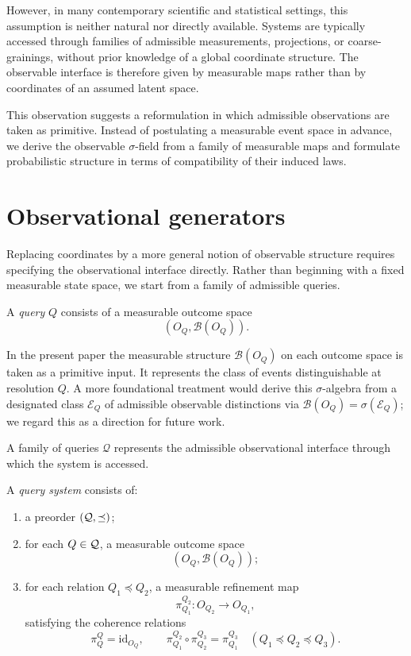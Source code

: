 However, in many contemporary scientific and statistical settings, this assumption is neither natural nor directly available. Systems are typically accessed through families of admissible measurements, projections, or coarse-grainings, without prior knowledge of a global coordinate structure. The observable interface is therefore given by measurable maps rather than by coordinates of an assumed latent space.

This observation suggests a reformulation in which admissible observations are taken as primitive. Instead of postulating a measurable event space in advance, we derive the observable $\sigma$-field from a family of measurable maps and formulate probabilistic structure in terms of compatibility of their induced laws.

\section{Observational generators}

Replacing coordinates by a more general notion of observable structure
requires specifying the observational interface directly.
Rather than beginning with a fixed measurable state space,
we start from a family of admissible queries.

\begin{definition}[Query]
\label{def:query}
A \emph{query} $Q$ consists of a measurable outcome space
\[
(O_Q,\mathcal B(O_Q)).
\]
\end{definition}

\begin{remark}
In the present paper the measurable structure $\mathcal B(O_Q)$ on
each outcome space is taken as a primitive input. It represents the
class of events distinguishable at resolution $Q$. A more foundational
treatment would derive this $\sigma$-algebra from a designated class
$\mathcal E_Q$ of admissible observable distinctions via
$\mathcal B(O_Q) = \sigma(\mathcal E_Q)$; we regard this as a
direction for future work.
\end{remark}

A family of queries $\mathcal Q$ represents the admissible observational
interface through which the system is accessed.

\begin{definition}
\label{def:query-system}
A \emph{query system} consists of:
\begin{enumerate}
\item a preorder $(\mathcal{Q},\preceq)$;
\item for each $Q\in\mathcal{Q}$, a measurable outcome space
\[
(O_Q,\mathcal B(O_Q));
\]
\item for each relation $Q_1\preceq Q_2$, a measurable refinement map
\[
\pi^{Q_2}_{Q_1}:O_{Q_2}\to O_{Q_1},
\]
satisfying the coherence relations
\[
\pi^Q_Q=\mathrm{id}_{O_Q},
\qquad
\pi^{Q_2}_{Q_1}\circ\pi^{Q_3}_{Q_2}=\pi^{Q_3}_{Q_1}
\quad
(Q_1\preceq Q_2\preceq Q_3).
\]
\end{enumerate}
\end{definition}


